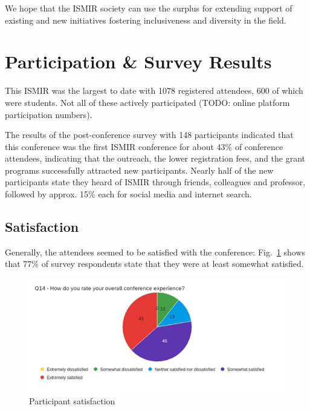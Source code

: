 \documentclass[%
10pt,								%
]
{scrartcl}
\begin{document}
                We hope that the ISMIR society can use the surplus for extending support of existing and new initiatives fostering inclusiveness and diversity in the field.
    
\section{Participation \& Survey Results}
    This ISMIR was the largest to date with 1078 registered attendees, 600 of which were students. Not all of these actively participated (TODO: online platform participation numbers).
    
The results of the post-conference survey with 148 participants indicated that this conference was the first ISMIR conference for about 43\% of conference attendees, indicating that the outreach, the lower registration fees, and the grant programs successfully attracted new participants. Nearly half of the new participants state they heard of ISMIR through friends, colleagues and professor, followed by approx. 15\% each for social media and internet search.

    \subsection{Satisfaction}
        Generally, the attendees seemed to be satisfied with the conference: Fig.~\ref{fig:survey_satisfaction} shows that 77\% of survey respondents state that they were at least somewhat satisfied.
        \begin{figure}%
            \includegraphics[width=\columnwidth]{fig/survey_satisfaction}%
            \caption{Participant satisfaction}%
            \label{fig:survey_satisfaction}%
        \end{figure}
        
\end{document}
